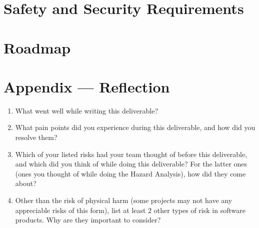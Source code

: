 \documentclass{article}
\begin{document}
\section{Safety and Security Requirements}


\section{Roadmap}


\newpage{}

\section*{Appendix --- Reflection}




\begin{enumerate}
    \item What went well while writing this deliverable? 
    \item What pain points did you experience during this deliverable, and how
    did you resolve them?
    \item Which of your listed risks had your team thought of before this
    deliverable, and which did you think of while doing this deliverable? For
    the latter ones (ones you thought of while doing the Hazard Analysis), how
    did they come about?
    \item Other than the risk of physical harm (some projects may not have any
    appreciable risks of this form), list at least 2 other types of risk in
    software products. Why are they important to consider?
\end{enumerate}
\end{document}
